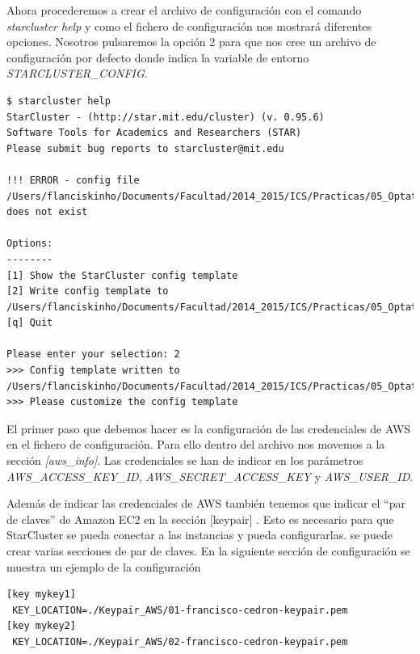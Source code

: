 \documentclass{article}
\begin{document}
Ahora procederemos a crear el archivo de configuración con el comando \emph{starcluster help} y como el fichero de configuración nos mostrará diferentes opciones. Nosotros pulsaremos la opción 2 para que nos cree un archivo de configuración por defecto donde indica la variable de entorno \emph{STARCLUSTER\_CONFIG}.
\begin{lstlisting}[style=minibash]
$ starcluster help
StarCluster - (http://star.mit.edu/cluster) (v. 0.95.6)
Software Tools for Academics and Researchers (STAR)
Please submit bug reports to starcluster@mit.edu

!!! ERROR - config file /Users/flanciskinho/Documents/Facultad/2014_2015/ICS/Practicas/05_Optativa/starclusterconfig does not exist

Options:
--------
[1] Show the StarCluster config template
[2] Write config template to /Users/flanciskinho/Documents/Facultad/2014_2015/ICS/Practicas/05_Optativa/starclusterconfig
[q] Quit

Please enter your selection: 2
>>> Config template written to /Users/flanciskinho/Documents/Facultad/2014_2015/ICS/Practicas/05_Optativa/starclusterconfig
>>> Please customize the config template
\end{lstlisting} 

	El primer paso que debemos hacer es la configuración de las credenciales de AWS en el fichero de configuración. Para ello dentro del archivo nos movemos a la sección \emph{[aws\_info]}. Las credenciales se han de indicar en los parámetros \emph{AWS\_ACCESS\_KEY\_ID}, \emph{AWS\_SECRET\_ACCESS\_KEY} y \emph{AWS\_USER\_ID}.
	
	Además de indicar las credenciales de AWS también tenemos que indicar el ``par de claves'' de Amazon EC2 en la sección [keypair] . Esto es necesario para que StarCluster se pueda conectar a las instancias y pueda configurarlas. se puede crear varias secciones de par de claves. En la siguiente sección de configuración se muestra un ejemplo de la configuración
\begin{lstlisting}
[key mykey1]
 KEY_LOCATION=./Keypair_AWS/01-francisco-cedron-keypair.pem
[key mykey2]
 KEY_LOCATION=./Keypair_AWS/02-francisco-cedron-keypair.pem
\end{lstlisting}
\end{document}
